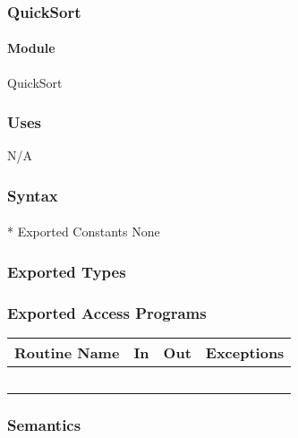 \documentclass[12pt]{article}
\begin{document}
                \subsubsection* {QuickSort}
                
                \paragraph*{Module}
                
                QuickSort
                
                \subsubsection* {Uses}
                N/A
                
                \subsubsection* {Syntax}

                \paragraph{}* {Exported Constants}
                None
                
                \subsubsection* {Exported Types}

                \subsubsection* {Exported Access Programs}
                
                \begin{tabular}{| l | l | l | p{5cm} |}
                \hline
                \textbf{Routine Name} & \textbf{In} & \textbf{Out} & \textbf{Exceptions}\\
                \hline
                 &  &  & ~\\
                \hline
                \end{tabular}
                
                \subsubsection* {Semantics}
                
\end{document}
